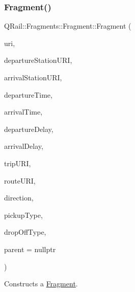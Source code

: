 \subsubsection{\texorpdfstring{Fragment()}{Fragment()}\hspace{0.1cm}{\footnotesize\ttfamily [2/2]}}
{\footnotesize\ttfamily Q\+Rail\+::\+Fragments\+::\+Fragment\+::\+Fragment (\begin{DoxyParamCaption}\item[{const Q\+Url \&}]{uri,  }\item[{const Q\+Url \&}]{departure\+Station\+U\+RI,  }\item[{const Q\+Url \&}]{arrival\+Station\+U\+RI,  }\item[{const Q\+Date\+Time \&}]{departure\+Time,  }\item[{const Q\+Date\+Time \&}]{arrival\+Time,  }\item[{const qint16 \&}]{departure\+Delay,  }\item[{const qint16 \&}]{arrival\+Delay,  }\item[{const Q\+Url \&}]{trip\+U\+RI,  }\item[{const Q\+Url \&}]{route\+U\+RI,  }\item[{const Q\+String \&}]{direction,  }\item[{const \mbox{\hyperlink{classQRail_1_1Fragments_1_1Fragment_ae3c308ba6dec16f36ecc5dba59f35af3}{G\+T\+F\+S\+Types}} \&}]{pickup\+Type,  }\item[{const \mbox{\hyperlink{classQRail_1_1Fragments_1_1Fragment_ae3c308ba6dec16f36ecc5dba59f35af3}{G\+T\+F\+S\+Types}} \&}]{drop\+Off\+Type,  }\item[{Q\+Object $\ast$}]{parent = {\ttfamily nullptr} }\end{DoxyParamCaption})\hspace{0.3cm}{\ttfamily [explicit]}}



Constructs a \mbox{\hyperlink{classQRail_1_1Fragments_1_1Fragment}{Fragment}}. 


